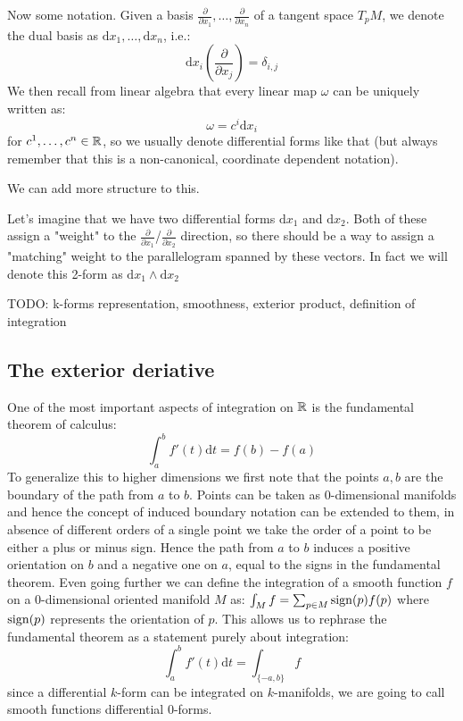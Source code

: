 Now some notation. Given a basis $\frac{\partial}{\partial x_1}, \dots, \frac{\partial}{\partial x_n}$
of a tangent space $T_p M$, we denote the dual basis as $\mathrm{d}x_1, \dots, \mathrm{d}x_n$, i.e.:
\[
	\mathrm{d}x_i(\frac{\partial}{\partial x_j}) = \delta_{i,j}
\]
We then recall from linear algebra that every linear map $\omega$ can be uniquely written as:
\[
	\omega = c^i \mathrm{d}x_i	
\]
for $c^1, \dots, c^n \in \mathbb{R}$, so we usually denote differential forms like that
(but always remember that this is a non-canonical, coordinate dependent notation).

We can add more structure to this. 


Let's imagine that we have two differential forms $\mathrm{d}x_1$ and $\mathrm{d}x_2$.
Both of these assign a "weight" to the $\frac{\partial}{\partial  x_1}$/$\frac{\partial}{\partial x_2}$ direction,
so there should be a way to assign a "matching" weight to the parallelogram spanned by these vectors.
In fact we will denote this 2-form as $\mathrm{d}x_1 \wedge \mathrm{d}x_2$

TODO: k-forms representation, smoothness, exterior product, definition of integration

\subsection{The exterior deriative}
One of the most important aspects of integration on $\mathbb{R}$ is the
fundamental theorem of calculus:
\[
	\int_a^b f'(t)\mathrm{d}t = f(b) - f(a)	
\]
To generalize this to higher dimensions we first note that the points $a,b$ are the
boundary of the path from $a$ to $b$. Points can be taken as 0-dimensional manifolds
and hence the concept of induced boundary notation can be extended to them, in absence
of different orders of a single point we take the order of a point to be either a plus
or minus sign. Hence the path from $a$ to $b$ induces a positive orientation on $b$
and a negative one on $a$, equal to the signs in the fundamental theorem. Even
going further we can define the integration of a smooth function $f$ on a 0-dimensional
oriented manifold $M$ as:
$
	\int_M f = \sum_{p \in M} \operatorname{sign}(p) f(p)
$
where $\operatorname{sign}(p)$ represents the orientation of $p$. This allows us to rephrase the
fundamental theorem as a statement purely about integration:
\[
	\int_a^b f'(t)\mathrm{d}t = \int_{\{-a, b\}} f
\]
since a differential $k$-form can be integrated on $k$-manifolds, we are going to
call smooth functions differential $0$-forms.

